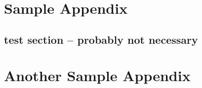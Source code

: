 \documentclass{ritthesis}
\begin{document}
\nocite{cheung,zhao,cao,zhang}

\nocite{*}


\appendix

\chapter{Sample Appendix}

\section{test section -- probably not necessary}
\lipsum[6-9]
\chapter{Another Sample Appendix}
\lipsum[10-11]

\end{document}
